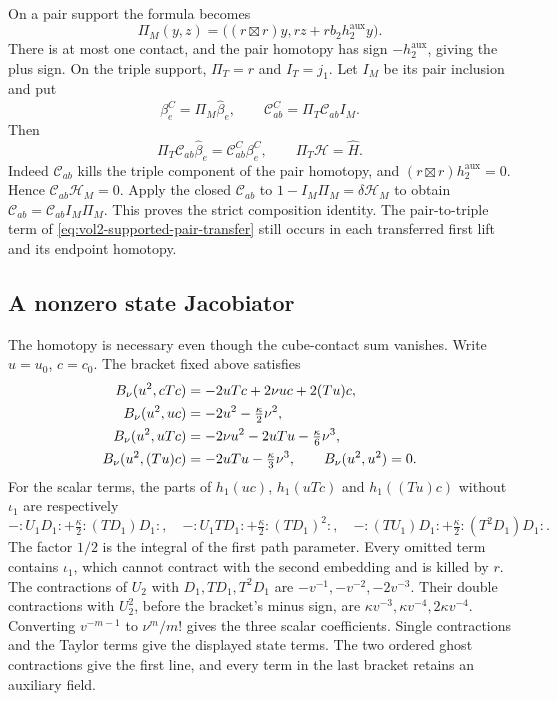 On a pair support the formula becomes
\begin{equation}\label{eq:vol2-supported-pair-transfer}
 \Pi_M(y,z)=\bigl((r\boxtimes r)y,
                       rz+rb_2h_2^{\mathrm{aux}}y\bigr).
\end{equation}
There is at most one contact, and the pair homotopy has sign
$-h_2^{\mathrm{aux}}$, giving the plus sign. On the triple
support, $\Pi_T=r$ and $I_T=j_1$.
Let $I_M$ be its pair inclusion and put
\[
 \beta_e^C=\Pi_M\widehat\beta_e,\qquad
 \mathcal C_{ab}^C=\Pi_T\mathcal C_{ab}I_M.
\]
Then
\begin{equation}\label{eq:vol2-supported-composition-transfer}
 \Pi_T\mathcal C_{ab}\widehat\beta_e
                  =\mathcal C_{ab}^C\beta_e^C,\qquad
 \Pi_T\mathcal H=\widehat H.
\end{equation}
Indeed $\mathcal C_{ab}$ kills the triple component of the
pair homotopy, and $(r\boxtimes r)h_2^{\mathrm{aux}}=0$.
Hence $\mathcal C_{ab}\mathcal H_M=0$. Apply the closed
$\mathcal C_{ab}$ to $1-I_M\Pi_M=\delta\mathcal H_M$ to
obtain $\mathcal C_{ab}=\mathcal C_{ab}I_M\Pi_M$.
This proves the strict composition identity. The pair-to-triple
term of \eqref{eq:vol2-supported-pair-transfer} still occurs in
each transferred first lift and its endpoint homotopy.

\subsection{A nonzero state Jacobiator}

The homotopy is necessary even though the cube-contact sum
vanishes. Write $u=u_0$, $c=c_0$. The bracket fixed above
satisfies
\begin{align}\label{eq:vol2-composite-bracket-values}
 B_\nu(u^2,cTc)&=-2uTc+2\nu uc+2(Tu)c,\notag\\
 B_\nu(u^2,uc)&=-2u^2-\tfrac\kappa2\nu^2,\notag\\
 B_\nu(u^2,uTc)&=-2\nu u^2-2uTu-\tfrac\kappa6\nu^3,\\
 B_\nu(u^2,(Tu)c)&=-2uTu-\tfrac\kappa3\nu^3,\qquad
 B_\nu(u^2,u^2)=0.\notag
\end{align}
For the scalar terms, the parts of $h_1(uc)$, $h_1(uTc)$
and $h_1((Tu)c)$ without $\iota_1$ are respectively
\[
 -{:}U_1D_1{:}+\tfrac\kappa2{:}(TD_1)D_1{:},\quad
 -{:}U_1TD_1{:}+\tfrac\kappa2{:}(TD_1)^2{:},\quad
 -{:}(TU_1)D_1{:}+\tfrac\kappa2{:}(T^2D_1)D_1{:}.
\]
The factor $1/2$ is the integral of the first path parameter.
Every omitted term contains $\iota_1$, which cannot contract
with the second embedding and is killed by $r$.
The contractions of $U_2$ with $D_1,TD_1,T^2D_1$ are
$-v^{-1},-v^{-2},-2v^{-3}$. Their double contractions with
$U_2^2$, before the bracket's minus sign, are
$\kappa v^{-3},\kappa v^{-4},2\kappa v^{-4}$.
Converting $v^{-m-1}$ to $\nu^m/m!$ gives the three scalar
coefficients. Single contractions and the Taylor terms give
the displayed state terms. The two ordered ghost contractions
give the first line, and every term in the last bracket
retains an auxiliary field.


